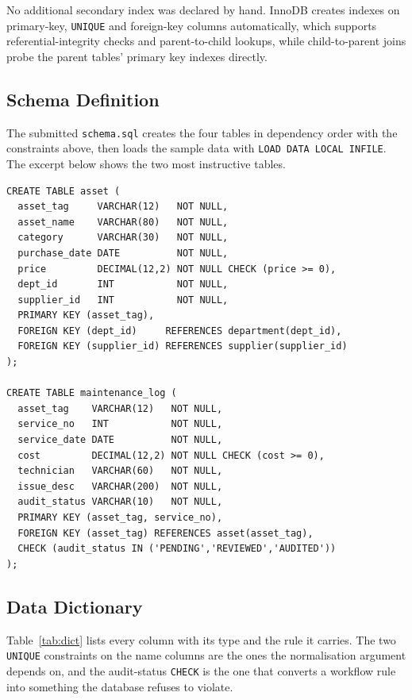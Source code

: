 \documentclass[conference,9pt]{IEEEtran}
\begin{document}
No additional secondary index was declared by hand. InnoDB creates indexes on
primary-key, \texttt{UNIQUE} and foreign-key columns automatically, which
supports referential-integrity checks and parent-to-child lookups, while
child-to-parent joins probe the parent tables' primary key indexes directly.

\subsection{Schema Definition}
The submitted \texttt{schema.sql} creates the four tables in dependency order
with the constraints above, then loads the sample data with
\texttt{LOAD DATA LOCAL INFILE}. The excerpt below shows the two most
instructive tables.

\begin{lstlisting}[style=sqlstyle,caption={Core DDL (excerpt)},label={lst:schema}]
CREATE TABLE asset (
  asset_tag     VARCHAR(12)   NOT NULL,
  asset_name    VARCHAR(80)   NOT NULL,
  category      VARCHAR(30)   NOT NULL,
  purchase_date DATE          NOT NULL,
  price         DECIMAL(12,2) NOT NULL CHECK (price >= 0),
  dept_id       INT           NOT NULL,
  supplier_id   INT           NOT NULL,
  PRIMARY KEY (asset_tag),
  FOREIGN KEY (dept_id)     REFERENCES department(dept_id),
  FOREIGN KEY (supplier_id) REFERENCES supplier(supplier_id)
);

CREATE TABLE maintenance_log (
  asset_tag    VARCHAR(12)   NOT NULL,
  service_no   INT           NOT NULL,
  service_date DATE          NOT NULL,
  cost         DECIMAL(12,2) NOT NULL CHECK (cost >= 0),
  technician   VARCHAR(60)   NOT NULL,
  issue_desc   VARCHAR(200)  NOT NULL,
  audit_status VARCHAR(10)   NOT NULL,
  PRIMARY KEY (asset_tag, service_no),
  FOREIGN KEY (asset_tag) REFERENCES asset(asset_tag),
  CHECK (audit_status IN ('PENDING','REVIEWED','AUDITED'))
);
\end{lstlisting}

\subsection{Data Dictionary}
Table~\ref{tab:dict} lists every column with its type and the rule it carries.
The two \texttt{UNIQUE} constraints on the name columns are the ones the
normalisation argument depends on, and the audit-status \texttt{CHECK} is the
one that converts a workflow rule into something the database refuses to
violate.
\end{document}
